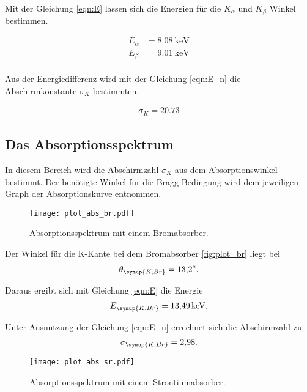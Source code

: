 Mit der Gleichung \eqref{eqn:E} lassen sich die Energien für die $K_\alpha$ und $K_\beta$
Winkel bestimmen.

\begin{align*}
  E_\alpha &= \SI{8.08}{\kilo\eV}\\
  E_\beta &= \SI{9.01}{\kilo\eV}\\
\end{align*}

Aus der Energiedifferenz wird mit der Gleichung \eqref{eqn:E_n} die Abschirmkonstante
$\sigma_K$ bestimmten.

\begin{align*}
  \sigma_K = \num{20.73}
\end{align*}

\subsection{Das Absorptionsspektrum}

In diesem Bereich wird die Abschirmzahl $\sigma_K$ aus dem Absorptionswinkel bestimmt.
Der benötigte Winkel für die Bragg-Bedingung wird dem jeweiligen Graph der Absorptionskurve
entnommen. \\

\begin{figure}[H]
  \centering
  \texttt{[image: plot\_abs\_br.pdf]}
  \caption{Absorptionsspektrum mit einem Bromabsorber.}
  \label{fig:plot_br}
\end{figure}

Der Winkel für die K-Kante bei dem Bromabsorber \eqref{fig:plot_br} liegt bei
\begin{align*}
  \theta_\symup{K,Br} = \SI{13.2}{\degree}.
\end{align*}

Daraus ergibt sich mit Gleichung \eqref{eqn:E} die Energie
\begin{align*}
  E_\symup{K,Br} = \SI{13.49}{\kilo\eV}.
\end{align*}

Unter Ausnutzung der Gleichung \eqref{eqn:E_n} errechnet sich die Abschirmzahl zu
\begin{align*}
  \sigma_\symup{K,Br} = \num{2.98} .
\end{align*}

\begin{figure}[H]
  \centering
  \texttt{[image: plot\_abs\_sr.pdf]}
  \caption{Absorptionsspektrum mit einem Strontiumabsorber.}
  \label{fig:plot_sr}
\end{figure}

